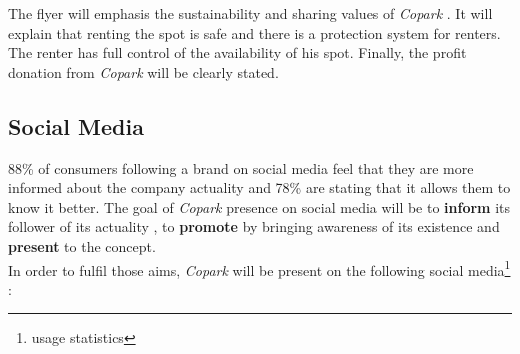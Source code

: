 \documentclass[12pt,a4paper,oneside]{book}
\newcommand{\bp}{\textit{Copark }}
\begin{document}
The flyer will emphasis the sustainability and sharing values of \bp. It will explain that renting the spot is safe and there is a protection system for renters. The renter has full control of the availability of his spot. Finally, the profit donation from \bp will be clearly stated.

\subsection{Social Media}
88\% of consumers following a brand on social media feel that they are more informed about the company actuality and  78\% are stating that it allows them to know it better.\cite{sminfo} The goal of \bp presence on social media will be to \textbf{inform} its follower of its actuality , to \textbf{promote} by bringing awareness of its existence and \textbf{present} to the concept.\\
In order to fulfil those aims, \bp will be present on the following social media\footnote{usage statistics\cite{smusage}} :
\end{document}
